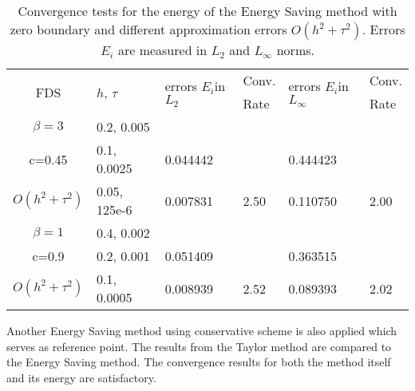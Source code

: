 \documentclass[%
 aip,
cp,  %
 amsmath,amssymb,%
 reprint,%
]{revtex4-2}
\begin{document}
\begin{table}[ht]
\centering
\small
		\begin{tabular}{||c|l|ll|ll||}
			\hline
			\hline
      \multirow{2  }{*}{FDS}        & \multirow{2  }{*}{$h$, $\tau$}  & \multirow{2  }{*}{errors $E_i$in$L_2$}  &Conv.& \multirow{2  }{*}{errors $E_i$in$L_\infty$}  &Conv.  \\
	                                        &                                                     &                                                                 &  Rate &                                                                       & Rate \\
   			\hline 
					\hline 
  $\beta=3$                &0.2, 0.005         &                    &                &                  &                   \\
   c=0.45                     &0.1, 0.0025         & 0.044442   &                & 0.444423  &                   \\
     $O(h^2 + \tau^ 2)$ &0.05, 125e-6  & 0.007831   & 2.50       & 0.110750  & 2.00   \\
	   \hline
			\hline 
       $\beta=1$           & 0.4, 0.002       &                   &           &                 &   \\
                  c=0.9       & 0.2, 0.001        & 0.051409   &          &0.363515  &   \\
  $O(h^2+ \tau^2)$  & 0.1, 0.0005       & 0.008939   & 2.52  &0.089393  & 2.02  \\
	   \hline
			\hline 
		\end{tabular}
		\caption{ Convergence tests for the energy of the Energy Saving method with zero boundary and different approximation errors $O(h^{2} + \tau^2 )$. Errors $E_i$ are measured in $L_2$ and $L_\infty$ norms. }
\label{tableD}
\end{table}

Another Energy Saving method using conservative scheme is also applied which serves as reference point. The results from the Taylor method are compared to the Energy Saving method. The convergence results for both the method itself and its energy are satisfactory.
\end{document}

